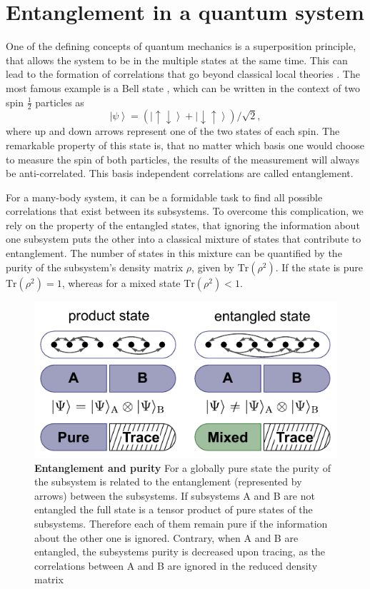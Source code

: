 \section{Entanglement in a quantum system}
One of the defining concepts of quantum mechanics is a superposition principle, that allows the system to be in the multiple states at the same time. This can lead to the formation of correlations that go beyond classical local theories \cite{Rev. Mod. Phys., 81:865, 2009}. The most famous example is a Bell state \cite{Physics, 1:195, 1964}, which can be written in the context of two spin $\frac{1}{2}$ particles as 
\begin{equation}
\left| \psi \right>=(\left| \uparrow \downarrow \right>+ \left| \downarrow \uparrow \right>)/\sqrt{2},
\end{equation}
where up and down arrows represent one of the two states of each spin. The remarkable property of this state is, that no matter which basis one would choose to measure the spin of both particles, the results of the measurement will always be anti-correlated. This basis independent correlations are called entanglement.

For a many-body system, it can be a formidable task to find all possible correlations that exist between its subsystems. To overcome this complication, we rely on the property of the entangled states, that ignoring the information about one subsystem puts the other into a classical mixture of states that contribute to entanglement. The number of states in this mixture can be quantified by the purity of the subsystem's density matrix $\rho$, given by $\textrm{Tr}(\rho^2)$. If the state is pure $\textrm{Tr}(\rho^2)=1$, whereas for a mixed state $\textrm{Tr}(\rho^2)<1$.

\begin{figure}[t!]
	\centering
	\includegraphics[scale=1]{figures/ETH_entanglemet.pdf}
	\caption{{\bf Entanglement and purity} For a globally pure state the purity of the subsystem is related to the entanglement (represented by arrows) between the subsystems. If subsystems A and B are not entangled the full state is a tensor product of pure states of the subsystems. Therefore each of them remain pure if the information about the other one is ignored. Contrary, when A and B are entangled, the subsystems purity is decreased upon tracing, as the correlations between A and B are ignored in the reduced density matrix }
	\label{fig:ETH_entanglemet}
\end{figure}  

